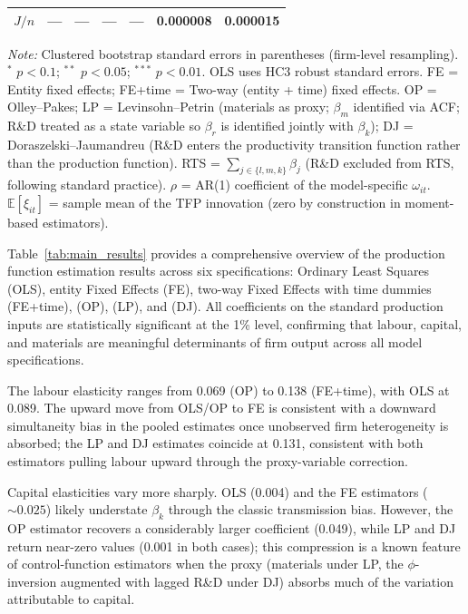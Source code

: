 \documentclass[a4paper, 12pt]{article}
\begin{document}
\begin{table}[htbp]
\begin{tabular}{lcccccc}
  $J/n$ & --- & --- & --- & --- & 0.000008 & 0.000015 \\
\bottomrule
\end{tabular}
\begin{flushleft}
\footnotesize
\textit{Note:} Clustered bootstrap standard errors in parentheses (firm-level resampling).
$^{*}$ $p<0.1$; $^{**}$ $p<0.05$; $^{***}$ $p<0.01$.
OLS uses HC3 robust standard errors.
FE = Entity fixed effects; FE+time = Two-way (entity + time) fixed effects.
OP = Olley--Pakes; LP = Levinsohn--Petrin (materials as proxy; $\beta_m$ identified via ACF; R\&D treated as a state variable so $\beta_r$ is identified jointly with $\beta_k$);
DJ = Doraszelski--Jaumandreu (R\&D enters the productivity transition function rather than the production function).
RTS = $\sum_{j \in \{l, m, k\}} \beta_j$ (R\&D excluded from RTS, following standard practice).
$\rho$ = AR(1) coefficient of the model-specific $\omega_{it}$.
$\mathbb{E}[\xi_{it}]$ = sample mean of the TFP innovation (zero by construction in moment-based estimators).
\end{flushleft}
\end{table}

Table~\ref{tab:main_results} \hypertarget{target:main_results}{} provides a comprehensive overview of the production function estimation results across six specifications: Ordinary Least Squares (OLS), entity Fixed Effects (FE), two-way Fixed Effects with time dummies (FE+time), \textcite{olley1992dynamics} (OP), \textcite{levinsohn2003estimating} (LP), and \textcite{doraszelski2013r} (DJ). All coefficients on the standard production inputs are statistically significant at the 1\% level, confirming that labour, capital, and materials are meaningful determinants of firm output across all model specifications.

The labour elasticity ranges from 0.069 (OP) to 0.138 (FE+time), with OLS at 0.089. The upward move from OLS/OP to FE is consistent with a downward simultaneity bias in the pooled estimates once unobserved firm heterogeneity is absorbed; the LP and DJ estimates coincide at 0.131, consistent with both estimators pulling labour upward through the proxy-variable correction.

Capital elasticities vary more sharply. OLS (0.004) and the FE estimators (${\sim}0.025$) likely understate $\beta_k$ through the classic transmission bias. However, the OP estimator recovers a considerably larger coefficient (0.049), while LP and DJ return near-zero values (0.001 in both cases); this compression is a known feature of control-function estimators when the proxy (materials under LP, the $\phi$-inversion augmented with lagged R\&D under DJ) absorbs much of the variation attributable to capital.
\end{document}
